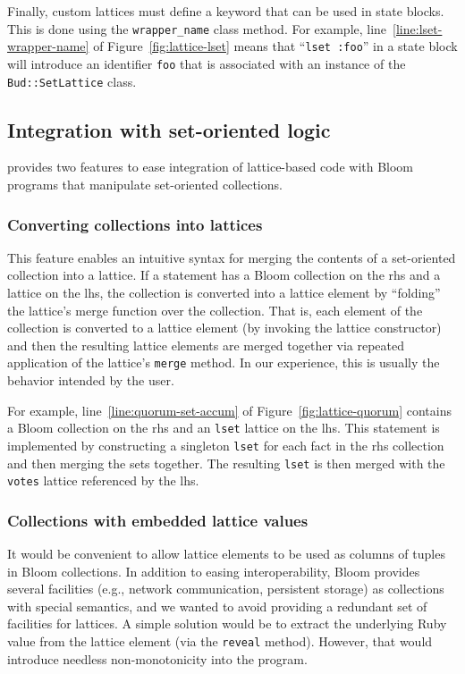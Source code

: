 Finally, custom lattices must define a keyword that can be used in \lang state
blocks. This is done using the \texttt{wrapper\_name} class method. For example,
line~\ref{line:lset-wrapper-name} of Figure~\ref{fig:lattice-lset} means that
``\texttt{lset :foo}'' in a \lang state block will introduce an identifier
\texttt{foo} that is associated with an instance of the \texttt{Bud::SetLattice}
class.

\subsection{Integration with set-oriented logic}
\label{sec:bloom-interop}
\lang provides two features to ease integration of lattice-based code with Bloom
programs that manipulate set-oriented collections.

\subsubsection{Converting collections into lattices}
This feature enables an intuitive syntax for merging the contents of a
set-oriented collection into a lattice. If a statement has a Bloom collection on
the rhs and a lattice on the lhs, the collection is converted into a lattice
element by ``folding'' the lattice's merge function over the collection. That
is, each element of the collection is converted to a lattice element (by
invoking the lattice constructor) and then the resulting lattice elements are
merged together via repeated application of the lattice's \texttt{merge}
method. In our experience, this is usually the behavior intended by the user.

For example, line~\ref{line:quorum-set-accum} of Figure~\ref{fig:lattice-quorum}
contains a Bloom collection on the rhs and an \texttt{lset} lattice on the
lhs. This statement is implemented by constructing a singleton \texttt{lset} for
each fact in the rhs collection and then merging the sets together. The
resulting \texttt{lset} is then merged with the \texttt{votes} lattice
referenced by the lhs.

\subsubsection{Collections with embedded lattice values}
\label{sec:lattice-embedding}
It would be convenient to allow lattice elements to be used as columns of
tuples in Bloom collections. In addition to easing interoperability, Bloom
provides several facilities (e.g., network communication, persistent storage) as
collections with special semantics, and we wanted to avoid providing a redundant
set of facilities for lattices. A simple solution would be to extract the
underlying Ruby value from the lattice element (via the \texttt{reveal} method).
However, that would introduce needless non-monotonicity into the program.

